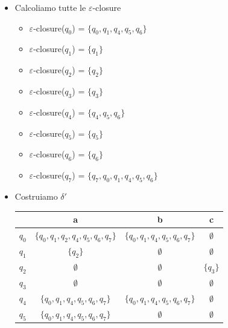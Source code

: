 \documentclass[12pt, a4paper]{report}
\begin{document}
\begin{exercise}
\begin{itemize}
\begin{itemize}
\begin{center}
\begin{tabular}{|c|c|c|c|c|}
                                    \hline
                                \end{tabular}
                            \end{center}
                            \item Calcoliamo tutte le $\varepsilon$-closure \begin{itemize}
                                \item $\varepsilon$-closure($q_0$) = $\{q_0,q_1,q_4,q_5,q_6\}$
                                \item $\varepsilon$-closure($q_1$) = $\{q_1\}$
                                \item $\varepsilon$-closure($q_2$) = $\{q_2\}$
                                \item $\varepsilon$-closure($q_3$) = $\{q_3\}$
                                \item $\varepsilon$-closure($q_4$) = $\{q_4,q_5,q_6\}$
                                \item $\varepsilon$-closure($q_5$) = $\{q_5\}$
                                \item $\varepsilon$-closure($q_6$) = $\{q_6\}$
                                \item $\varepsilon$-closure($q_7$) = $\{q_7,q_0,q_1,q_4,q_5,q_6\}$
                            \end{itemize}
                            \item Costruiamo $\delta'$ \begin{center}
                                \begin{tabular}{|c|c|c|c|}
                                    \hline
                                     & a & b & c \\
                                    \hline
                                    $q_0$ & $\{q_0,q_1,q_2,q_4,q_5,q_6,q_7\}$ & $\{q_0,q_1,q_4,q_5,q_6,q_7\}$ & $\emptyset$\\
                                    $q_1$ & $\{q_2\}$ & $\emptyset$ & $\emptyset$ \\
                                    $q_2$ & $\emptyset$ & $\emptyset$ & $\{q_3\}$ \\
                                    $q_3$ & $\emptyset$ & $\emptyset$ & $\emptyset$ \\
                                    $q_4$ & $\{q_0,q_1,q_4,q_5,q_6,q_7\}$ & $\{q_0,q_1,q_4,q_5,q_6,q_7\}$ & $\emptyset$ \\
                                    $q_5$ & $\{q_0,q_1,q_4,q_5,q_6,q_7\}$ & $\emptyset$ & $\emptyset$ \\

\end{tabular}
\end{center}
\end{itemize}
\end{itemize}
\end{exercise}
\end{document}
